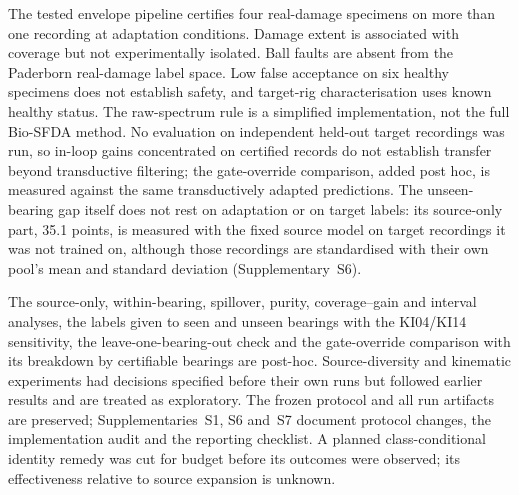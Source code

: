 The tested envelope pipeline certifies four real-damage specimens on more than one recording at adaptation conditions. Damage extent is associated with coverage but not experimentally isolated. Ball faults are absent from the Paderborn real-damage label space. Low false acceptance on six healthy specimens does not establish safety, and target-rig characterisation uses known healthy status. The raw-spectrum rule is a simplified implementation, not the full Bio-SFDA method. No evaluation on independent held-out target recordings was run, so in-loop gains concentrated on certified records do not establish transfer beyond transductive filtering; the gate-override comparison, added post hoc, is measured against the same transductively adapted predictions. The unseen-bearing gap itself does not rest on adaptation or on target labels: its source-only part, 35.1 points, is measured with the fixed source model on target recordings it was not trained on, although those recordings are standardised with their own pool's mean and standard deviation (Supplementary~S6).

The source-only, within-bearing, spillover, purity, coverage--gain and interval analyses, the labels given to seen and unseen bearings with the KI04/KI14 sensitivity, the leave-one-bearing-out check and the gate-override comparison with its breakdown by certifiable bearings are post-hoc. Source-diversity and kinematic experiments had decisions specified before their own runs but followed earlier results and are treated as exploratory. The frozen protocol and all run artifacts are preserved; Supplementaries~S1, S6 and~S7 document protocol changes, the implementation audit and the reporting checklist. A planned class-conditional identity remedy was cut for budget before its outcomes were observed; its effectiveness relative to source expansion is unknown.
